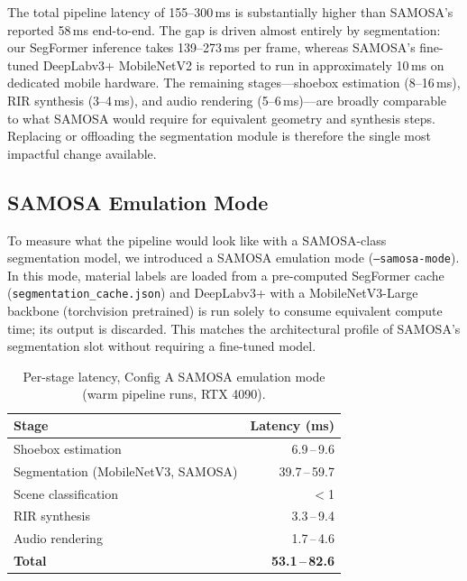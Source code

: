 \documentclass[11pt]{article}
\begin{document}
The total pipeline latency of 155--300\,ms is substantially higher than SAMOSA's
reported 58\,ms end-to-end. The gap is driven almost entirely by segmentation:
our SegFormer inference takes 139--273\,ms per frame, whereas SAMOSA's fine-tuned
DeepLabv3+ MobileNetV2 is reported to run in approximately 10\,ms on dedicated
mobile hardware. The remaining stages---shoebox estimation (8--16\,ms), RIR
synthesis (3--4\,ms), and audio rendering (5--6\,ms)---are broadly comparable to
what SAMOSA would require for equivalent geometry and synthesis steps. Replacing
or offloading the segmentation module is therefore the single most impactful
change available.

\subsection{SAMOSA Emulation Mode}

To measure what the pipeline would look like with a SAMOSA-class segmentation
model, we introduced a SAMOSA emulation mode (\texttt{--samosa-mode}). In this
mode, material labels are loaded from a pre-computed SegFormer cache
(\texttt{segmentation\_cache.json}) and DeepLabv3+ with a MobileNetV3-Large
backbone (torchvision pretrained) is run solely to consume equivalent compute
time; its output is discarded. This matches the architectural profile of
SAMOSA's segmentation slot without requiring a fine-tuned model.

\begin{table}[H]
\small\centering
\caption{Per-stage latency, Config A SAMOSA emulation mode (warm pipeline runs, RTX 4090).}
\label{tab:samosa_results}
\begin{tabular}{@{}lr@{}}
\toprule
\textbf{Stage} & \textbf{Latency (ms)}\\
\midrule
Shoebox estimation                  & 6.9\,--\,9.6\\
Segmentation (MobileNetV3, SAMOSA)  & 39.7\,--\,59.7\\
Scene classification                & $<$1\\
RIR synthesis                       & 3.3\,--\,9.4\\
Audio rendering                     & 1.7\,--\,4.6\\
\midrule
\textbf{Total}                      & \textbf{53.1\,--\,82.6}\\
\bottomrule
\end{tabular}
\end{table}
\end{document}
